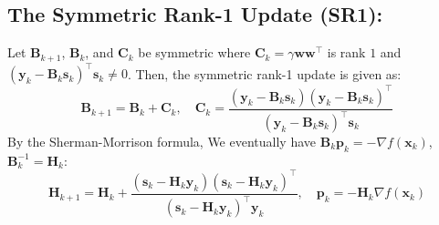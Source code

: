 \documentclass[11pt]{article}
\theoremstyle{plain} %
\newenvironment{topic}
{\color{C2}\normalfont\begin{framed}\begingroup }
  {\endgroup\end{framed}}
\theoremstyle{remark}
\begin{document}
\subsection{The Symmetric Rank-1 Update (SR1):}
\begin{topic}
  Let $\mathbf{B}_{k+1}$, $\mathbf{B}_k$, and $\mathbf{C}_k$ be symmetric where
  $\mathbf{C}_k=\gamma \mathbf{w} \mathbf{w}^{\top}$ is rank $1$ and $\left(\mathbf{y}_k-\mathbf{B}_k \mathbf{s}_k\right)^{\top} \mathbf{s}_k \neq 0$.
  Then, the symmetric rank-1 update is given as:
  $$
    \mathbf{B}_{k+1} = \mathbf{B}_{k} + \mathbf{C}_k, \quad \mathbf{C}_k=\frac{\left(\mathbf{y}_k-\mathbf{B}_k \mathbf{s}_k\right)\left(\mathbf{y}_k-\mathbf{B}_k \mathbf{s}_k\right)^{\top}}{\left(\mathbf{y}_k-\mathbf{B}_k \mathbf{s}_k\right)^{\top} \mathbf{s}_k}
  $$
  By the Sherman-Morrison formula,
  We eventually have $\mathbf{B}_k \mathbf{p}_k = -\nabla f\left(\mathbf{x}_k\right)$, $\mathbf{B}_{k}^{-1} = \mathbf{H}_k$:
  $$
    \mathbf{H}_{k+1} = \mathbf{H}_k + \frac{\left(\mathbf{s}_k - \mathbf{H}_k \mathbf{y}_k\right)\left(\mathbf{s}_k - \mathbf{H}_k \mathbf{y}_k\right)^{\top}}{\left(\mathbf{s}_k - \mathbf{H}_k \mathbf{y}_k\right)^{\top} \mathbf{y}_k}, \quad
    \mathbf{p}_k = -\mathbf{H}_k \nabla f\left(\mathbf{x}_k\right)
  $$
\end{topic}
\end{document}
